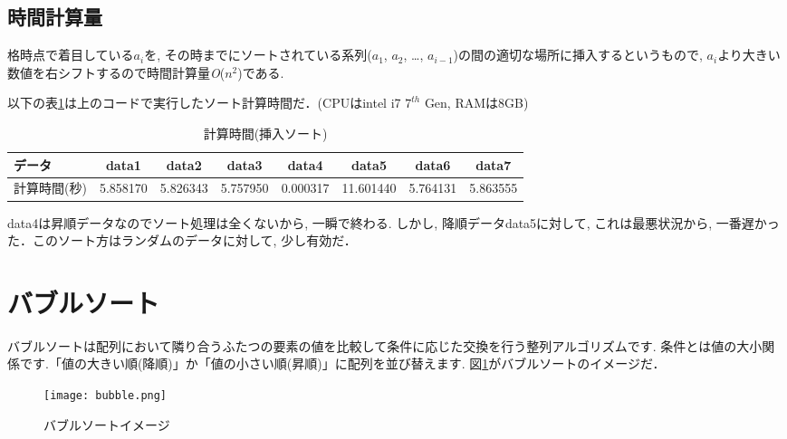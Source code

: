 \documentclass[a4j, titlepage]{jarticle}
\begin{document}
\subsection{時間計算量}
格時点で着目している$a_i$を, その時までにソートされている系列($a_1$, $a_2$, \dots, $a_{i-1}$)の間の適切な場所に挿入するというもので, $a_i$より大きい数値を右シフトするので時間計算量\textit{O}($n^2$)である.

以下の表\ref{table:insert}は上のコードで実行したソート計算時間だ．(CPUはintel i7 $7^{th}$ Gen, RAMは8GB)
\begin{table}[bth]
\label{table:insert}
\caption{計算時間(挿入ソート)}
\begin{center}
\begin{tabular}{|l|ccccccc|}
\hline
データ & data1 & data2 &data3 &data4 &data5 &data6 &data7 \\ \hline
計算時間(秒) & 5.858170 & 5.826343 & 5.757950 & \cellcolor{green!20}0.000317 & \cellcolor{red!20} 11.601440 & 5.764131 & 5.863555\\ \hline
\end{tabular}
\end{center}
\end{table}
data4は昇順データなのでソート処理は全くないから, 一瞬で終わる. しかし, 降順データdata5に対して, これは最悪状況から,
一番遅かった．このソート方はランダムのデータに対して, 少し有効だ．





\section{バブルソート}
バブルソートは配列において隣り合うふたつの要素の値を比較して条件に応じた交換を行う整列アルゴリズムです. 条件とは値の大小関係です.「値の大きい順(降順)」か「値の小さい順(昇順)」に配列を並び替えます. 図\ref{bubble}がバブルソートのイメージだ．
\begin{figure}[tbh]
\centering \texttt{[image: bubble.png]}
\caption{バブルソートイメージ}
\label{bubble}
\end{figure}
\end{document}
